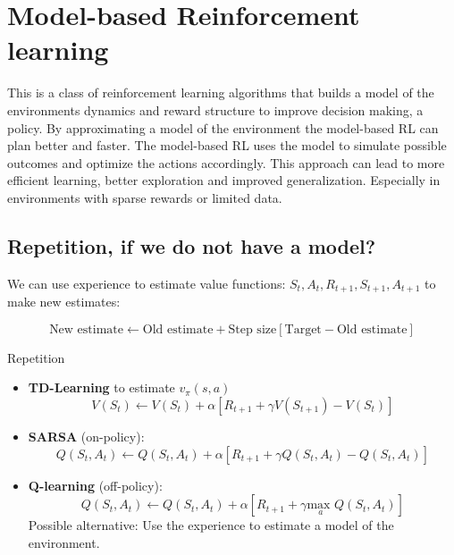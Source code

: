 
\section{Model-based Reinforcement learning}
This is a class of reinforcement learning algorithms that builds a model of the environments dynamics and reward structure to improve decision making, a policy. By approximating a model of the environment the model-based RL can plan better and faster. The model-based RL uses the model to simulate possible outcomes and optimize the actions accordingly. This approach can lead to more efficient learning, better exploration and improved generalization. Especially in environments with sparse rewards or limited data. 

\subsection{Repetition, if we do not have a model?}
We can use experience to estimate value functions: $S_t, A_t, R_{t+1}, S_{t+1}, A_{t+1}$ to make new estimates:

	\begin{equation}
		\text{New estimate} \leftarrow \text{Old estimate} + \text{Step size} [\text{Target} - \text{Old estimate}]
	\end{equation}

\begin{wbox}{Repetition}
\begin{itemize}
	\item \textbf{TD-Learning} to estimate $v_\pi(s,a)$
		\begin{equation}
			V(S_t) \leftarrow V(S_t) + \alpha [R_{t+1} + \gamma V(S_{t+1}) - V(S_t)]
		\end{equation}
	\item \textbf{SARSA} (on-policy): 
		\begin{equation}
			Q(S_t, A_t) \leftarrow Q(S_t,A_t) + \alpha[R_{t+1} + \gamma Q(S_t,A_t) - Q(S_t,A_t)] 
		\end{equation}
	\item \textbf{Q-learning} (off-policy):
		\begin{equation}
			Q(S_t, A_t) \leftarrow Q(S_t,A_t) + \alpha [R_{t+1} + \gamma \underset{a}{\text{max }}Q(S_t,A_t)]
		\end{equation}
		Possible alternative: Use the experience to estimate a model of the environment. 
\end{itemize}
\end{wbox}


